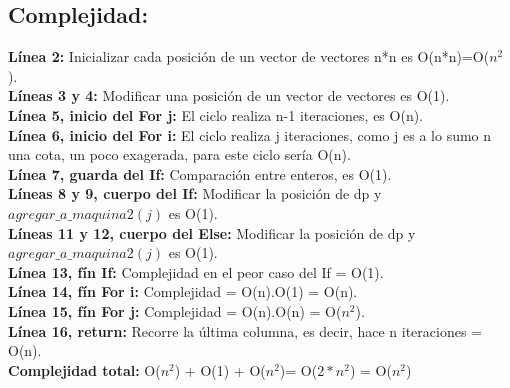 \subsection{Complejidad:}

\textbf{Línea 2:} Inicializar cada posición de un vector de vectores n*n es O(n*n)=O($n^{2}$).\\

\textbf{Líneas 3 y 4:} Modificar una posición de un vector de vectores es O(1).\\

\textbf{Línea 5, inicio del For j:} El ciclo realiza n-1 iteraciones, es O(n).\\

\textbf{Línea 6, inicio del For i:} El ciclo realiza j iteraciones, como j es a lo sumo n una cota, un poco exagerada, para este ciclo sería O(n).\\

\textbf{Línea 7, guarda del If:} Comparación entre enteros, es O(1).\\

\textbf{Líneas 8 y 9, cuerpo del If:} Modificar la posición de dp y $agregar\_a\_maquina2(j)$ es O(1).\\

\textbf{Líneas 11 y 12, cuerpo del Else:} Modificar la posición de dp y $agregar\_a\_maquina2(j)$ es O(1).\\

\textbf{Línea 13, fín If:} Complejidad en el peor caso del If = O(1).\\

\textbf{Línea 14, fín For i:} Complejidad = O(n).O(1) = O(n).\\

\textbf{Línea 15, fín For j:} Complejidad = O(n).O(n) = O($n^{2}$).\\

\textbf{Línea 16, return:} Recorre la última columna, es decir, hace n iteraciones = O(n).\\

\textbf{Complejidad total:} O($n^{2}$) + O(1) + O($n^{2}$)= O($2*n^{2}$) = O($n^{2}$)
